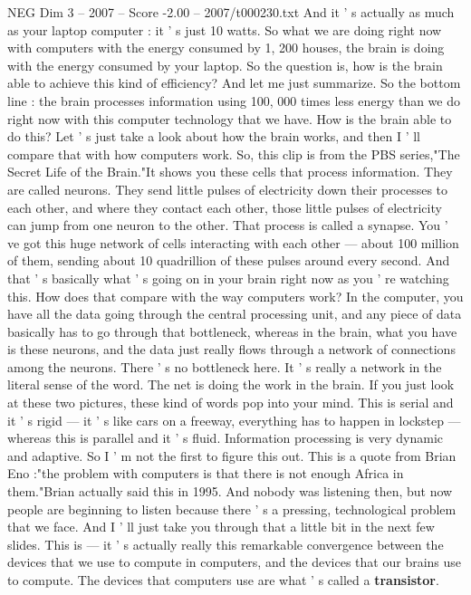 \begin{textsample}{NEG Dim 3 – 2007 – Score -2.00 – 2007/t000230.txt}
And it ' s actually as much as your laptop computer : it ' s just 10 watts.
So what we are doing right now with computers with the energy consumed by 1, 200 houses, the brain is doing with the energy consumed by your laptop.
So the question is, how is the brain able to achieve this kind of efficiency?
And let me just summarize.
So the bottom line : the brain processes information using 100, 000 times less energy than we do right now with this computer technology that we have.
How is the brain able to do this?
Let ' s just take a look about how the brain works, and then I ' ll compare that with how computers work.
So, this clip is from the PBS series,"The Secret Life of the Brain."It shows you these cells that process information.
They are called neurons.
They send little pulses of electricity down their processes to each other, and where they contact each other, those little pulses of electricity can jump from one neuron to the other.
That process is called a synapse.
You ' ve got this huge network of cells interacting with each other — about 100 million of them, sending about 10 quadrillion of these pulses around every second.
And that ' s basically what ' s going on in your brain right now as you ' re watching this.
How does that compare with the way computers work?
In the computer, you have all the data going through the central processing unit, and any piece of data basically has to go through that bottleneck, whereas in the brain, what you have is these neurons, and the data just really flows through a network of connections among the neurons.
There ' s no bottleneck here.
It ' s really a network in the literal sense of the word.
The net is doing the work in the brain.
If you just look at these two pictures, these kind of words pop into your mind.
This is serial and it ' s rigid — it ' s like cars on a freeway, everything has to happen in lockstep — whereas this is parallel and it ' s fluid.
Information processing is very dynamic and adaptive.
So I ' m not the first to figure this out.
This is a quote from Brian Eno :"the problem with computers is that there is not enough Africa in them."Brian actually said this in 1995.
And nobody was listening then, but now people are beginning to listen because there ' s a pressing, technological problem that we face.
And I ' ll just take you through that a little bit in the next few slides.
This is — it ' s actually really this remarkable convergence between the devices that we use to compute in computers, and the devices that our brains use to compute.
The devices that computers use are what ' s called a \textbf{transistor}.

\end{textsample}
